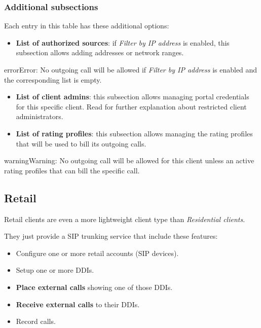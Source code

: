 \documentclass[letterpaper,10pt,english]{sphinxmanual}
\begin{document}
\subsubsection{Additional subsections}
\label{administration_portal/brand/clients/residential:additional-subsections}
Each entry in this table has these additional options:
\begin{itemize}
\item {} 
\textbf{List of authorized sources}: if \emph{Filter by IP address} is enabled, this subsection allows adding addresses or network ranges.

\end{itemize}

\begin{notice}{error}{Error:}
No outgoing call will be allowed if \emph{Filter by IP address} is enabled and the corresponding list is empty.
\end{notice}
\begin{itemize}
\item {} 
\textbf{List of client admins}: this subsection allows managing portal credentials for this specific client. Read {\hyperref[api_rest/acls:acls]{}}
for further explanation about restricted client administrators.

\item {} 
\textbf{List of rating profiles}: this subsection allows managing the rating profiles that will be used to bill its outgoing calls.

\end{itemize}

\begin{notice}{warning}{Warning:}
No outgoing call will be allowed for this client unless an active rating profiles that can
bill the specific call.
\end{notice}


\subsection{Retail}
\label{administration_portal/brand/clients/retail:retail-clients}\label{administration_portal/brand/clients/retail:retail}\label{administration_portal/brand/clients/retail::doc}
Retail clients are even a more lightweight client type than \emph{Residential clients}.

They just provide a SIP trunking service that include these features:
\begin{itemize}
\item {} 
Configure one or more retail accounts (SIP devices).

\item {} 
Setup one or more DDIs.

\item {} 
\textbf{Place external calls} showing one of those DDIs.

\item {} 
\textbf{Receive external calls} to their DDIs.

\item {} 
Record calls.

\end{itemize}
\end{document}
